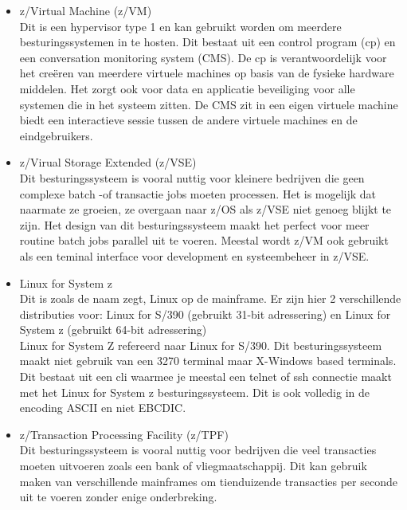 \begin{itemize}
    \item z/Virtual Machine (z/VM)\\
    Dit is een hypervisor type 1 en kan gebruikt worden om meerdere besturingssystemen in te hosten. Dit bestaat uit een control program (cp) en een conversation monitoring system (CMS). De cp is verantwoordelijk voor het creëren van meerdere virtuele machines op basis van de fysieke hardware middelen. Het zorgt ook voor data en applicatie beveiliging voor alle systemen die in het systeem zitten. De CMS zit in een eigen virtuele machine biedt een interactieve sessie tussen de andere virtuele machines en de eindgebruikers. \autocite{IBMb} \\
    
    \item z/Virual Storage Extended (z/VSE) \\
    Dit besturingssysteem is vooral nuttig voor kleinere bedrijven die geen complexe batch -of transactie jobs moeten processen. Het is mogelijk dat naarmate ze groeien, ze overgaan naar z/OS als z/VSE niet genoeg blijkt te zijn. Het design van dit besturingssysteem maakt het perfect voor meer routine batch jobs parallel uit te voeren. Meestal wordt z/VM ook gebruikt als een teminal interface voor development en systeembeheer in z/VSE. \autocite{IBMb} \\
    
    \item Linux for System z \\
    Dit is zoals de naam zegt, Linux op de mainframe. Er zijn hier 2 verschillende distributies voor: Linux for S/390 (gebruikt 31-bit adressering) en Linux for System z (gebruikt 64-bit adressering) \\
    Linux for System Z refereerd naar Linux for S/390. Dit besturingssysteem maakt niet gebruik van een 3270 terminal maar X-Windows based terminals. Dit bestaat uit een cli waarmee je meestal een telnet of ssh connectie maakt met het Linux for System z besturingssysteem. Dit is ook volledig in de encoding ASCII en niet EBCDIC. \autocite{IBMb} \\
    
    \item z/Transaction Processing Facility (z/TPF) \\
    Dit besturingssysteem is vooral nuttig voor bedrijven die veel transacties moeten uitvoeren zoals een bank of vliegmaatschappij. Dit kan gebruik maken van verschillende mainframes om tienduizende transacties per seconde uit te voeren zonder enige onderbreking. \autocite{IBMb}
\end{itemize}



